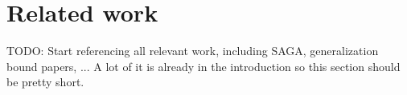 \section{Related work}

TODO: Start referencing all relevant work, including SAGA, generalization bound papers, ...
A lot of it is already in the introduction so this section should be pretty short.